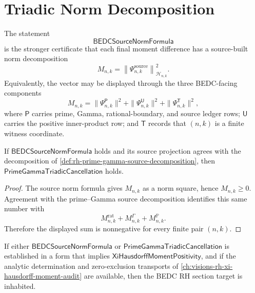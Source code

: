 \section{Triadic Norm Decomposition}
\label{sec:rh-final-triadic-norm-decomposition}

\begin{definition}
\label{def:rh-bedc-source-norm-formula}
The statement
$$
\mathsf{BEDCSourceNormFormula}
$$
is the stronger certificate that each final moment difference has a
source-built norm decomposition
$$
M_{n,k}
=
\left\|
\Psi_{n,k}^{\mathrm{source}}
\right\|_{\mathcal H_{n,k}}^2.
$$
Equivalently, the vector may be displayed through the three BEDC-facing
components
$$
M_{n,k}
=
\|\Psi_{n,k}^{\mathsf P}\|^2
+
\|\Psi_{n,k}^{\mathsf U}\|^2
+
\|\Psi_{n,k}^{\mathsf T}\|^2,
$$
where $\mathsf P$ carries prime, Gamma, rational-boundary, and source
ledger rows; $\mathsf U$ carries the positive inner-product row; and
$\mathsf T$ records that $(n,k)$ is a finite witness coordinate.
\end{definition}

\begin{theorem}
\label{thm:rh-source-norm-formula-implies-triadic-cancellation}
If $\mathsf{BEDCSourceNormFormula}$ holds and its source projection agrees
with the decomposition of
\autoref{def:rh-prime-gamma-source-decomposition}, then
$\mathsf{PrimeGammaTriadicCancellation}$ holds.
\end{theorem}

\begin{proof}
The source norm formula gives $M_{n,k}$ as a norm square, hence
$M_{n,k}\ge0$. Agreement with the prime--Gamma source decomposition
identifies this same number with
$$
M_{n,k}^{\mathrm{rat}}
+
M_{n,k}^{\Gamma}
+
M_{n,k}^{\mathbb P}.
$$
Therefore the displayed sum is nonnegative for every finite pair
$(n,k)$.
\end{proof}

\begin{theorem}
\label{thm:rh-final-moment-core-conditionally-rh-sufficient}
If either $\mathsf{BEDCSourceNormFormula}$ or
$\mathsf{PrimeGammaTriadicCancellation}$ is established in a form that
implies $\mathsf{XiHausdorffMomentPositivity}$, and if the analytic
determination and zero-exclusion transports of
\autoref{ch:visions-rh-xi-hausdorff-moment-audit} are available, then
the BEDC RH section target is inhabited.
\end{theorem}

